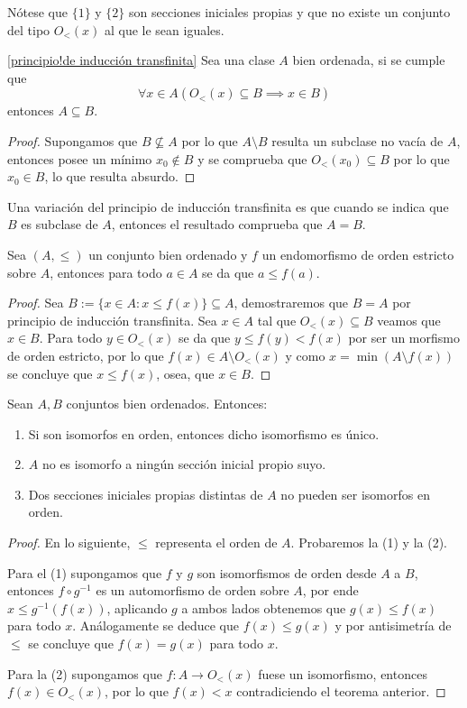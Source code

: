 \documentclass[11pt,a4paper]{book}
\begin{document}
Nótese que $\{1\}$ y $\{2\}$ son secciones iniciales propias y que no existe un conjunto del tipo $O_<(x)$ al que le sean iguales.
\begin{thm}\ref{principio!de inducción transfinita}
	Sea una clase $A$ bien ordenada, si se cumple que
	$$\forall x\in A(O_<(x)\subseteq B\implies x\in B)$$
	entonces $A\subseteq B$.
\end{thm}
\begin{proof}
	Supongamos que $B\nsubseteq A$ por lo que $A\setminus B$ resulta un subclase no vacía de $A$, entonces posee un mínimo $x_0\notin B$ y se comprueba que $O_<(x_0)\subseteq B$ por lo que $x_0\in B$, lo que resulta absurdo.
\end{proof}
Una variación del principio de inducción transfinita es que cuando se indica que $B$ es subclase de $A$, entonces el resultado comprueba que $A=B$.
\begin{thm}
	Sea $(A,\leq)$ un conjunto bien ordenado y $f$ un endomorfismo de orden estricto sobre $A$, entonces para todo $a\in A$ se da que $a\leq f(a)$.
\end{thm}
\begin{proof}
	Sea $B:=\{x\in A:x\leq f(x)\}\subseteq A$, demostraremos que $B=A$ por principio de inducción transfinita. Sea $x\in A$ tal que $O_<(x)\subseteq B$ veamos que $x\in B$. Para todo $y\in O_<(x)$ se da que $y\leq f(y)<f(x)$ por ser un morfismo de orden estricto, por lo que $f(x)\in A\setminus O_<(x)$ y como $x=\min(A\setminus f(x))$ se concluye que $x\leq f(x)$, osea, que $x\in B$.
\end{proof}
\begin{cor}
	Sean $A,B$ conjuntos bien ordenados. Entonces:
	\begin{enumerate}
		\item Si son isomorfos en orden, entonces dicho isomorfismo es único.
		\item $A$ no es isomorfo a ningún sección inicial propio suyo.
		\item Dos secciones iniciales propias distintas de $A$ no pueden ser isomorfos en orden.
	\end{enumerate}
\end{cor}
\begin{proof}
	En lo siguiente, $\leq$ representa el orden de $A$. Probaremos la (1) y la (2).

	Para el (1) supongamos que $f$ y $g$ son isomorfismos de orden desde $A$ a $B$, entonces $f\circ g^{-1}$ es un automorfismo de orden sobre $A$, por ende $x\leq g^{-1}(f(x))$, aplicando $g$ a ambos lados obtenemos que $g(x)\leq f(x)$ para todo $x$. Análogamente se deduce que $f(x)\leq g(x)$ y por antisimetría de $\leq$ se concluye que $f(x)=g(x)$ para todo $x$.

	Para la (2) supongamos que $f:A\rightarrow O_<(x)$ fuese un isomorfismo, entonces $f(x)\in O_<(x)$, por lo que $f(x)<x$ contradiciendo el teorema anterior.
\end{proof}
\end{document}

